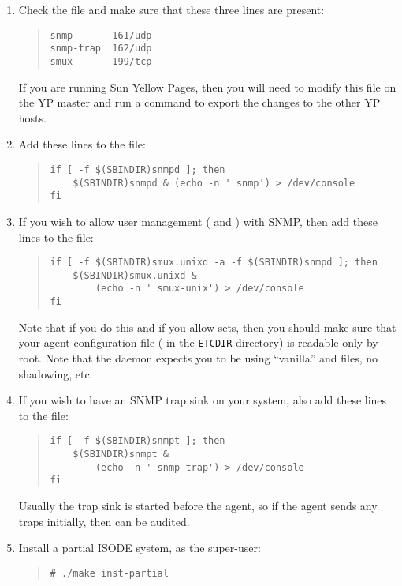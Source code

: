 \begin{enumerate}
\item	Check the  file and make sure that these three
	lines are present:
\begin{quote}\small\begin{verbatim}
snmp       161/udp
snmp-trap  162/udp
smux       199/tcp
\end{verbatim}\end{quote}
If you are running Sun Yellow Pages,
then you will need to modify this file on the YP master and run a command to
export the changes to the other YP hosts.

\item	Add these lines to the  file:
\begin{quote}\small\begin{verbatim}
if [ -f $(SBINDIR)snmpd ]; then
    $(SBINDIR)snmpd & (echo -n ' snmp') > /dev/console
fi
\end{verbatim}\end{quote}

\item	If you wish to allow user management ( and )
with SNMP,
then add these lines to the  file:
\begin{quote}\small\begin{verbatim}
if [ -f $(SBINDIR)smux.unixd -a -f $(SBINDIR)snmpd ]; then
    $(SBINDIR)smux.unixd &
        (echo -n ' smux-unix') > /dev/console
fi
\end{verbatim}\end{quote}
Note that if you do this and if you allow sets,
then you should make sure that your agent configuration file
( in the \verb"ETCDIR" directory)
is readable only by root.
Note that the daemon expects you to be using ``vanilla'' 
and  files, no shadowing, etc.

\item	If you wish to have an SNMP trap sink on your system,
	also add these lines to the  file:
\begin{quote}\small\begin{verbatim}
if [ -f $(SBINDIR)snmpt ]; then
    $(SBINDIR)snmpt &
        (echo -n ' snmp-trap') > /dev/console
fi
\end{verbatim}\end{quote}
Usually the trap sink is started before the agent,
so if the agent sends any traps initially,
then can be audited.

\item	Install a partial ISODE system, as the super-user:
\begin{quote}\small\begin{verbatim}
# ./make inst-partial
\end{verbatim}\end{quote}


\end{enumerate}
